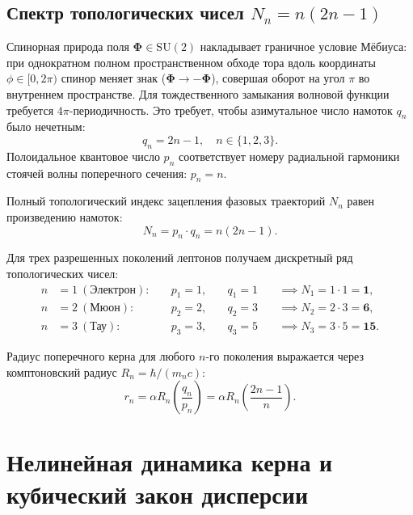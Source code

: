 \documentclass[12pt,a4paper]{article}
\begin{document}
	\subsection{Спектр топологических чисел $N_n = n(2n-1)$}
	Спинорная природа поля $\boldsymbol{\Phi} \in \mathrm{SU}(2)$ накладывает граничное условие Мёбиуса: при однократном полном пространственном обходе тора вдоль координаты $\phi \in [0, 2\pi)$ спинор меняет знак ($\boldsymbol{\Phi} \to -\boldsymbol{\Phi}$), совершая оборот на угол $\pi$ во внутреннем пространстве. Для тождественного замыкания волновой функции требуется $4\pi$-периодичность. Это требует, чтобы азимутальное число намоток $q_n$ было нечетным:
	\begin{equation}
		q_n = 2n - 1, \quad n \in \{1, 2, 3\}.
	\end{equation}
	Полоидальное квантовое число $p_n$ соответствует номеру радиальной гармоники стоячей волны поперечного сечения: $p_n = n$.
	
	Полный топологический индекс зацепления фазовых траекторий $N_n$ равен произведению намоток:
	\begin{equation}
		N_n = p_n \cdot q_n = n(2n - 1).
	\end{equation}
	
	Для трех разрешенных поколений лептонов получаем дискретный ряд топологических чисел:
	\begin{align}
		n &= 1 \ (\text{Электрон}): \quad &p_1 = 1, \quad &q_1 = 1 \quad &\implies N_1 = 1 \cdot 1 = \mathbf{1}, \\
		n &= 2 \ (\text{Мюон}):     \quad &p_2 = 2, \quad &q_2 = 3 \quad &\implies N_2 = 2 \cdot 3 = \mathbf{6}, \\
		n &= 3 \ (\text{Тау}):      \quad &p_3 = 3, \quad &q_3 = 5 \quad &\implies N_3 = 3 \cdot 5 = \mathbf{15}.
	\end{align}
	
	Радиус поперечного керна для любого $n$-го поколения выражается через комптоновский радиус $R_n = \hbar / (m_n c)$:
	\begin{equation}
		r_n = \alpha R_n \left( \frac{q_n}{p_n} \right) = \alpha R_n \left( \frac{2n-1}{n} \right).
	\end{equation}
	
	\section{Нелинейная динамика керна и кубический закон дисперсии}
	
\end{document}
